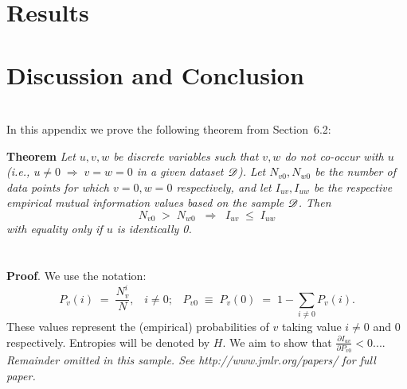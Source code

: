\documentclass[twoside,11pt]{article}
\newcommand{\dataset}{{\cal D}}
\newcommand{\fracpartial}[2]{\frac{\partial #1}{\partial  #2}}
\begin{document}
\section{Results}

\section{Discussion and Conclusion}






\newpage

\appendix
\section{}
\label{app:theorem}



In this appendix we prove the following theorem from
Section~6.2:

\noindent
{\bf Theorem} {\it Let $u,v,w$ be discrete variables such that $v, w$ do
not co-occur with $u$ (i.e., $u\neq0\;\Rightarrow \;v=w=0$ in a given
dataset $\dataset$). Let $N_{v0},N_{w0}$ be the number of data points for
which $v=0, w=0$ respectively, and let $I_{uv},I_{uw}$ be the
respective empirical mutual information values based on the sample
$\dataset$. Then
\[
	N_{v0} \;>\; N_{w0}\;\;\Rightarrow\;\;I_{uv} \;\leq\;I_{uw}
\]
with equality only if $u$ is identically 0.} \hfill\BlackBox

\section{}

\noindent
{\bf Proof}. We use the notation:
\[
P_v(i) \;=\;\frac{N_v^i}{N},\;\;\;i \neq 0;\;\;\;
P_{v0}\;\equiv\;P_v(0)\; = \;1 - \sum_{i\neq 0}P_v(i).
\]
These values represent the (empirical) probabilities of $v$
taking value $i\neq 0$ and 0 respectively.  Entropies will be denoted
by $H$. We aim to show that $\fracpartial{I_{uv}}{P_{v0}} < 0$....\\

{\noindent \em Remainder omitted in this sample. See http://www.jmlr.org/papers/ for full paper.}


\vskip 0.2in

\end{document}
